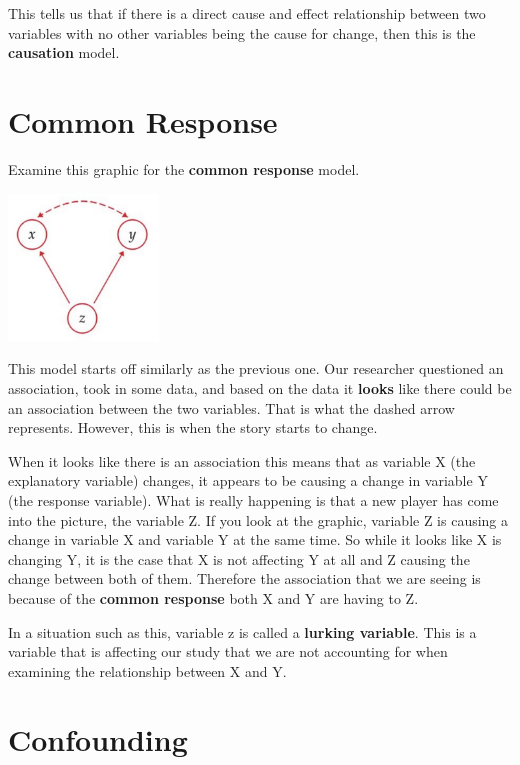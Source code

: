 \documentclass[
  letterpaper,
  DIV=11,
  numbers=noendperiod]{scrreprt}
\begin{document}
This tells us that if there is a direct cause and effect relationship
between two variables with no other variables being the cause for
change, then this is the \textbf{causation} model.

\section*{Common Response}\label{common-response}


Examine this graphic for the \textbf{common response} model.

\includegraphics[width=0.3\textwidth,height=\textheight]{./images/IDV_2.jpg}

This model starts off similarly as the previous one. Our researcher
questioned an association, took in some data, and based on the data it
\textbf{looks} like there could be an association between the two
variables. That is what the dashed arrow represents. However, this is
when the story starts to change.

When it looks like there is an association this means that as variable X
(the explanatory variable) changes, it appears to be causing a change in
variable Y (the response variable). What is really happening is that a
new player has come into the picture, the variable Z. If you look at the
graphic, variable Z is causing a change in variable X and variable Y at
the same time. So while it looks like X is changing Y, it is the case
that X is not affecting Y at all and Z causing the change between both
of them. Therefore the association that we are seeing is because of the
\textbf{common response} both X and Y are having to Z.

In a situation such as this, variable z is called a \textbf{lurking
variable}. This is a variable that is affecting our study that we are
not accounting for when examining the relationship between X and Y.

\section*{Confounding}\label{confounding}
\end{document}
